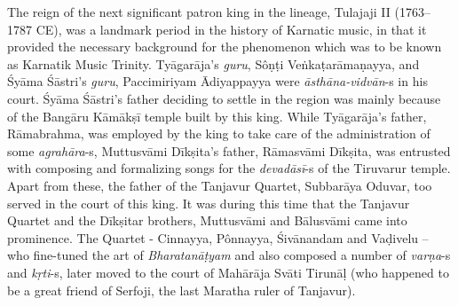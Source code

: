 The reign of the next significant patron king in the lineage, Tulajaji II (1763–1787 CE), was a landmark period in the history of Karnatic music, in that it provided the necessary background for the phenomenon which was to be known as Karnatik Music Trinity. Tyāgarāja’s \textit{guru}, Sôṇṭi Veṅkaṭarāmaṇayya, and Śyāma Śāstri’s \textit{guru}, Paccimiriyam Ādiyappayya were \textit{āsthāna-vidvān}-s in his court. Śyāma Śāstri’s father deciding to settle in the region was mainly because of the Bangāru Kāmākṣī temple built by this king. While Tyāgarāja’s father, Rāmabrahma, was employed by the king to take care of the administration of some \textit{agrahāra}-s, Muttusvāmi Dīkṣita’s father, Rāmasvāmi Dīkṣita, was entrusted with composing and formalizing songs for the \textit{devadāsī}-s of the Tiruvarur temple. Apart from these, the father of the Tanjavur Quartet, Subbarāya Oduvar, too served in the court of this king. It was during this time that the Tanjavur Quartet and the Dīkṣitar brothers, Muttusvāmi and Bālusvāmi came into prominence. The Quartet - Cinnayya, Pônnayya, Śivānandam and Vaḍivelu – who fine-tuned the art of \textit{Bharatanāṭyam} and also composed a number of \textit{varṇa}-s and \textit{kṛti}-s, later moved to the court of Mahārāja Svāti Tirunāḷ (who happened to be a great friend of Serfoji, the last Maratha ruler of Tanjavur).



